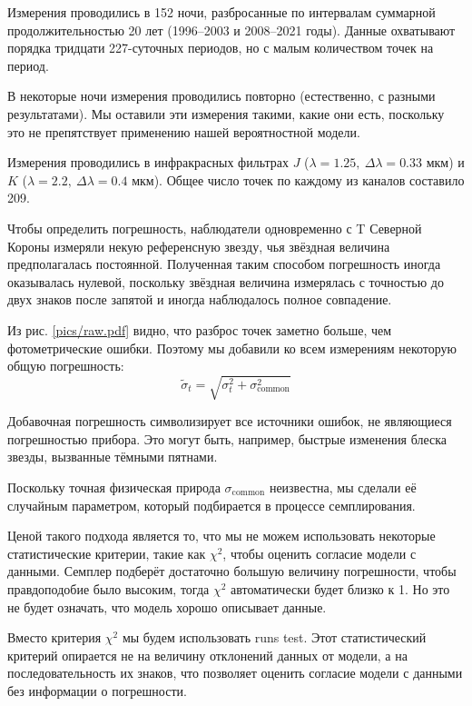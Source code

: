 Измерения проводились в 152 ночи, разбросанные по интервалам суммарной продолжительностью 20 лет (1996--2003 и 2008--2021 годы). Данные охватывают порядка тридцати 227-суточных периодов, но с малым количеством точек на период.

В некоторые ночи измерения проводились повторно (естественно, с разными результатами). Мы оставили эти измерения такими, какие они есть, поскольку это не препятствует применению нашей вероятностной модели.

Измерения проводились в инфракрасных фильтрах $J$ ($\lambda = 1.25,\ \Delta \lambda = 0.33$ мкм) и $K$ ($\lambda = 2.2,\ \Delta \lambda = 0.4$ мкм). Общее число точек по каждому из каналов составило 209.


Чтобы определить погрешность, наблюдатели одновременно с T Северной Короны измеряли некую референсную звезду, чья звёздная величина предполагалась постоянной. Полученная таким способом погрешность иногда оказывалась нулевой, поскольку звёздная величина измерялась с точностью до двух знаков после запятой и иногда наблюдалось полное совпадение.

Из рис. \ref{pics/raw.pdf} видно, что разброс точек заметно больше, чем фотометрические ошибки.
Поэтому мы добавили ко всем измерениям некоторую общую погрешность:
\[
\tilde \sigma_t = \sqrt{\sigma_t^2 + \sigma_\text{common}^2}
\]

Добавочная погрешность символизирует все источники ошибок, не являющиеся погрешностью прибора. Это могут быть, например, быстрые изменения блеска звезды, вызванные тёмными пятнами.

Поскольку точная физическая природа $\sigma_\text{common}$ неизвестна, мы сделали её случайным параметром, который подбирается в процессе семплирования.

Ценой такого подхода является то, что мы не можем использовать некоторые статистические критерии, такие как $\chi^2$, чтобы оценить согласие модели с данными. Семплер подберёт достаточно большую величину погрешности, чтобы правдоподобие было высоким, тогда $\chi^2$ автоматически будет близко к 1. Но это не будет означать, что модель хорошо описывает данные.

Вместо критерия $\chi^2$ мы будем использовать runs test. Этот статистический критерий опирается не на величину отклонений данных от модели, а на последовательность их знаков, что позволяет оценить согласие модели с данными без информации о погрешности.


